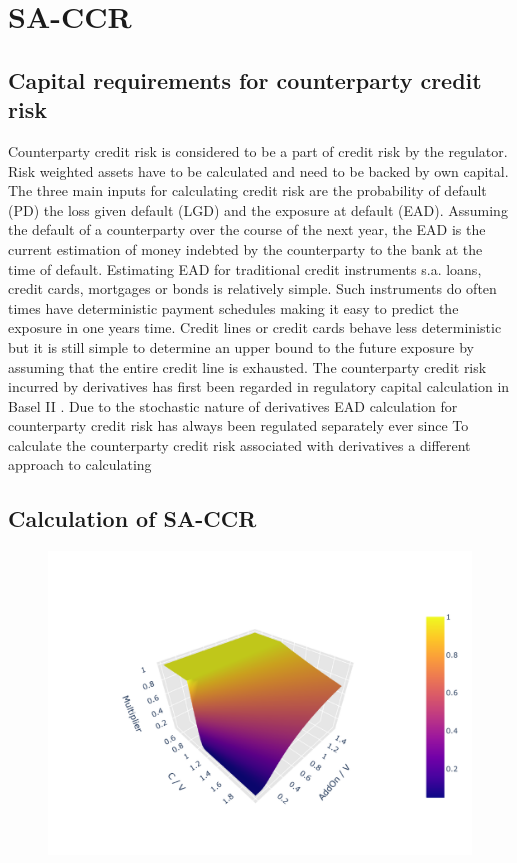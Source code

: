 \documentclass[../Thesis_AHoecherl.tex]{subfiles}
\begin{document}
\section{SA-CCR}\label{SA-CCR}

\subsection{Capital requirements for counterparty credit risk}
Counterparty credit risk is considered to be a part of credit risk by the regulator. Risk weighted assets have to be calculated and need to be backed by own capital. The three main inputs for calculating credit risk are the probability of default (PD) the loss given default (LGD) and the exposure at default (EAD). Assuming the default of a counterparty over the course of the next year, the EAD is the current estimation of money indebted by the counterparty to the bank at the time of default. Estimating EAD for traditional credit instruments s.a. loans, credit cards, mortgages or bonds is relatively simple. Such instruments do often times have deterministic payment schedules making it easy to predict the exposure in one years time. Credit lines or credit cards behave less deterministic but it is still simple to determine an upper bound to the future exposure by assuming that the entire credit line is exhausted.
The counterparty credit risk incurred by derivatives has first been regarded in regulatory capital calculation in Basel II \cite{basel2}.
Due to the stochastic nature of derivatives EAD calculation for counterparty credit risk has always been regulated separately ever since 
To calculate the counterparty credit risk associated with derivatives a different approach to calculating

\subsection{Calculation of SA-CCR}



\begin{figure}
	\centering
	\includegraphics[scale=0.9]{Graphics/SACCR_Multiplier_Function.pdf}
    \caption{}
\end{figure}
\end{document}
